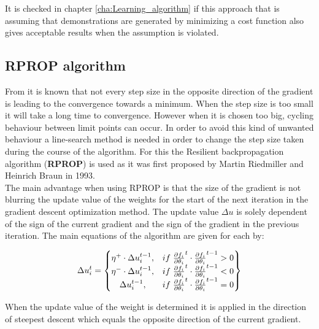 It is checked in chapter \ref{cha:Learning_algorithm} if this approach that is assuming that demonstrations are generated by minimizing a cost function also gives acceptable results when the assumption is violated.

\subsection{RPROP algorithm}
From \cite{Panos_opti} it is known that not every step size in the opposite direction of the gradient is leading to the convergence towards a minimum. When the step size is too small it will take a long time to convergence. However when it is chosen too big, cycling behaviour between limit points can occur. In order to avoid this kind of unwanted behaviour a line-search method is needed in order to change the step size taken during the course of the algorithm. For this the Resilient backpropagation algorithm (\textbf{RPROP}) \cite{RPROP} is used as it was first proposed by Martin Riedmiller and Heinrich Braun in 1993.\\

The main advantage when using RPROP is that the size of the gradient is not blurring the update value of the weights for the start of the next iteration in the gradient descent optimization method. The update value $\Delta u$ is solely dependent of the sign of the current gradient and the sign of the gradient in the previous iteration. The main equations of the algorithm are given for each by: 

\begin{equation}\label{eq:7}
	\Delta u^t_i =
	\begin{Bmatrix}
		 \eta^+ \cdot \Delta u^{t-1}_i, & if \hspace{1 mm} \pdv{f_i}{\theta_i}^t \cdot \pdv{f_i}{\theta_i}^{t-1} > 0 \\
		 \eta^- \cdot \Delta u^{t-1}_i, & if \hspace{1 mm} \pdv{f_i}{\theta_i}^t \cdot \pdv{f_i}{\theta_i}^{t-1} < 0 \\
		  \Delta u^{t-1}_i, & if \hspace{1 mm} \pdv{f_i}{\theta_i}^t \cdot \pdv{f_i}{\theta_i}^{t-1} = 0 \\
	\end{Bmatrix}
\end{equation}

When the update value of the weight is determined it is applied in the direction of steepest descent which equals the opposite direction of the current gradient. 

